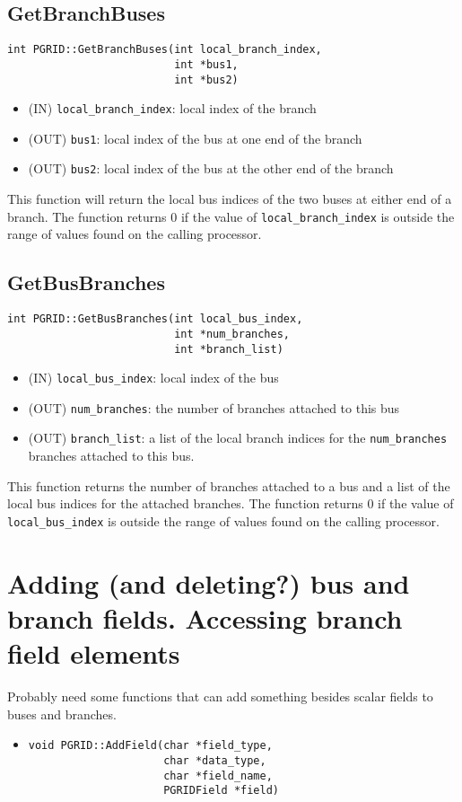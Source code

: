 \documentclass[12pt]{article}
\begin{document}
\subsection{GetBranchBuses}
\begin{verbatim}
int PGRID::GetBranchBuses(int local_branch_index,
                          int *bus1,
                          int *bus2)
\end{verbatim}
\begin{itemize}
\item (IN) \texttt{local\_branch\_index}: local index of the branch
\item (OUT) \texttt{bus1}: local index of the bus at one end of the branch
\item (OUT) \texttt{bus2}: local index of the bus at the other end of the
branch
\end{itemize}
This function will return the local bus indices of the two buses at either end
of a branch. The function returns 0 if the value of \texttt{local\_branch\_index} is
outside the range of values found on the calling processor.
\subsection{GetBusBranches}
\begin{verbatim}
int PGRID::GetBusBranches(int local_bus_index,
                          int *num_branches,
                          int *branch_list)
\end{verbatim}
\begin{itemize}
\item (IN) \texttt{local\_bus\_index}: local index of the bus
\item (OUT) \texttt{num\_branches}: the number of branches attached to this bus
\item (OUT) \texttt{branch\_list}: a list of the local branch indices for the
\texttt{num\_branches} branches attached to this bus.
\end{itemize}
This function returns the number of branches attached to a bus and a list of the
local bus indices for the attached branches. The function returns 0 if the value
of \texttt{local\_bus\_index} is outside the range of values found on the
calling processor.

\section{Adding (and deleting?) bus and branch fields. Accessing branch field
elements}
Probably need some functions that can add something besides scalar fields to
buses and branches.
\begin{itemize}
\item \begin{verbatim}
void PGRID::AddField(char *field_type,
                     char *data_type,
                     char *field_name,
                     PGRIDField *field)
\end{verbatim}
\end{itemize}
\end{document}

